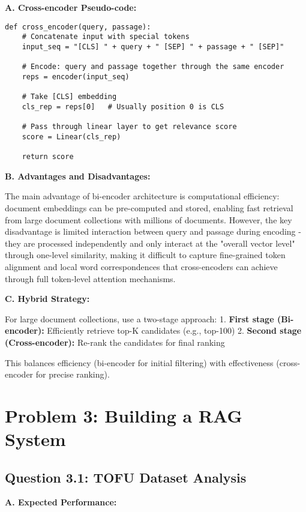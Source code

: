 \documentclass[11pt]{article}
\begin{document}
\textbf{A. Cross-encoder Pseudo-code:}

\begin{verbatim}
def cross_encoder(query, passage):
    # Concatenate input with special tokens
    input_seq = "[CLS] " + query + " [SEP] " + passage + " [SEP]"
    
    # Encode: query and passage together through the same encoder
    reps = encoder(input_seq)
    
    # Take [CLS] embedding
    cls_rep = reps[0]   # Usually position 0 is CLS
    
    # Pass through linear layer to get relevance score
    score = Linear(cls_rep)
    
    return score
\end{verbatim}

\textbf{B. Advantages and Disadvantages:}

The main advantage of bi-encoder architecture is computational efficiency: document embeddings can be pre-computed and stored, enabling fast retrieval from large document collections with millions of documents. However, the key disadvantage is limited interaction between query and passage during encoding - they are processed independently and only interact at the "overall vector level" through one-level similarity, making it difficult to capture fine-grained token alignment and local word correspondences that cross-encoders can achieve through full token-level attention mechanisms.


\textbf{C. Hybrid Strategy:}

For large document collections, use a two-stage approach:
1. \textbf{First stage (Bi-encoder):} Efficiently retrieve top-K candidates (e.g., top-100)
2. \textbf{Second stage (Cross-encoder):} Re-rank the candidates for final ranking

This balances efficiency (bi-encoder for initial filtering) with effectiveness (cross-encoder for precise ranking).

\section{Problem 3: Building a RAG System}

\subsection{Question 3.1: TOFU Dataset Analysis}

\textbf{A. Expected Performance:}
\end{document}
